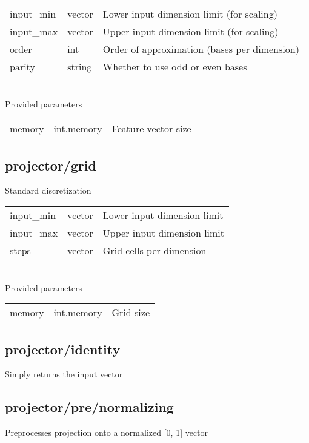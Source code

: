 \noindent\begin{tabular}{@{}lll@{}}
input\_min&vector&Lower input dimension limit (for scaling)\\
input\_max&vector&Upper input dimension limit (for scaling)\\
order&int&Order of approximation (bases per dimension)\\
parity&string&Whether to use odd or even bases\\
\end{tabular}
\\

\noindent Provided parameters\\

\noindent\begin{tabular}{@{}lll@{}}
memory&int.memory&Feature vector size\\
\end{tabular}
\subsection{projector/grid}
\noindent Standard discretization\\

\noindent\begin{tabular}{@{}lll@{}}
input\_min&vector&Lower input dimension limit\\
input\_max&vector&Upper input dimension limit\\
steps&vector&Grid cells per dimension\\
\end{tabular}
\\

\noindent Provided parameters\\

\noindent\begin{tabular}{@{}lll@{}}
memory&int.memory&Grid size\\
\end{tabular}
\subsection{projector/identity}
\noindent Simply returns the input vector\\

\subsection{projector/pre/normalizing}
\noindent Preprocesses projection onto a normalized [0, 1] vector\\

